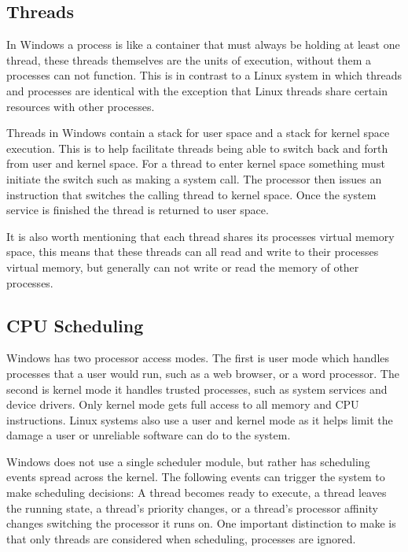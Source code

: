\documentclass[letterpaper, 10pt, onecolumn, draftclsnofoot]{IEEEtran}
\begin{document}
\subsection{Threads}

In Windows a process is like a container that must always be holding at least one thread, these threads themselves are the units of execution, without them a processes can not function. This is in contrast to a Linux system in which threads and processes are identical with the exception that Linux threads share certain resources with other processes.\cite{wi_p1}

Threads in Windows contain a stack for user space and a stack for kernel space execution. This is to help facilitate threads being able to switch back and forth from user and kernel space. For a thread to enter kernel space something must initiate the switch such as making a system call. The processor then issues an instruction that switches the calling thread to kernel space. Once the system service is finished the thread is returned to user space.\cite{wi_p1}

It is also worth mentioning that each thread shares its processes virtual memory space, this means that these threads can all read and write to their processes virtual memory, but generally can not write or read the memory of other processes.\cite{wi_p1}

\subsection{CPU Scheduling}

Windows has two processor access modes. The first is user mode which handles processes that a user would run, such as a web browser, or a word processor. The second is kernel mode it handles trusted processes, such as system services and device drivers. Only kernel mode gets full access to all memory and CPU instructions. Linux systems also use a user and kernel mode as it helps limit the damage a user or unreliable software can do to the system.\cite{wi_p1}

Windows does not use a single scheduler module, but rather has scheduling events spread across the kernel. The following events can trigger the system to make scheduling decisions: A thread becomes ready to execute, a thread leaves the running state, a thread's priority changes, or a thread's processor affinity changes switching the processor it runs on. One important distinction to make is that only threads are considered when scheduling, processes are ignored.\cite{wi_p1} 
\end{document}
